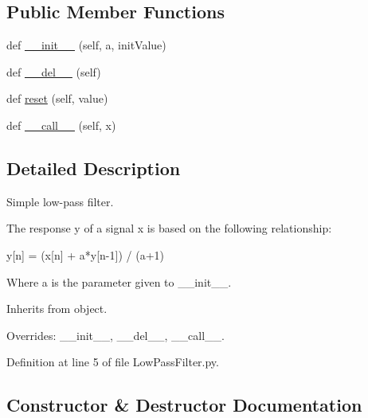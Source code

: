 \subsection*{Public Member Functions}
\begin{DoxyCompactItemize}
\item 
def \mbox{\hyperlink{classwindshape_1_1drone_1_1common_1_1_low_pass_filter_1_1_low_pass_filter_aec2612729f5fd2c71dbbdb0780b0dd8f}{\+\_\+\+\_\+init\+\_\+\+\_\+}} (self, a, init\+Value)
\item 
def \mbox{\hyperlink{classwindshape_1_1drone_1_1common_1_1_low_pass_filter_1_1_low_pass_filter_ae6f9d1dd9254ed3a0f2db3e56018039c}{\+\_\+\+\_\+del\+\_\+\+\_\+}} (self)
\item 
def \mbox{\hyperlink{classwindshape_1_1drone_1_1common_1_1_low_pass_filter_1_1_low_pass_filter_a7524c63f98753225a2ed9b8af5740778}{reset}} (self, value)
\item 
def \mbox{\hyperlink{classwindshape_1_1drone_1_1common_1_1_low_pass_filter_1_1_low_pass_filter_affefdaba14cb9cd690ae7ab9881cc16c}{\+\_\+\+\_\+call\+\_\+\+\_\+}} (self, x)
\end{DoxyCompactItemize}


\subsection{Detailed Description}
\begin{DoxyVerb}Simple low-pass filter.

The response y of a signal x is based on the following relationship:

y[n] = (x[n] + a*y[n-1]) / (a+1)

Where a is the parameter given to __init__. 

Inherits from object.

Overrides: __init__, __del__, __call__.
\end{DoxyVerb}
 

Definition at line 5 of file Low\+Pass\+Filter.\+py.



\subsection{Constructor \& Destructor Documentation}
\mbox{\label{classwindshape_1_1drone_1_1common_1_1_low_pass_filter_1_1_low_pass_filter_aec2612729f5fd2c71dbbdb0780b0dd8f}} 
